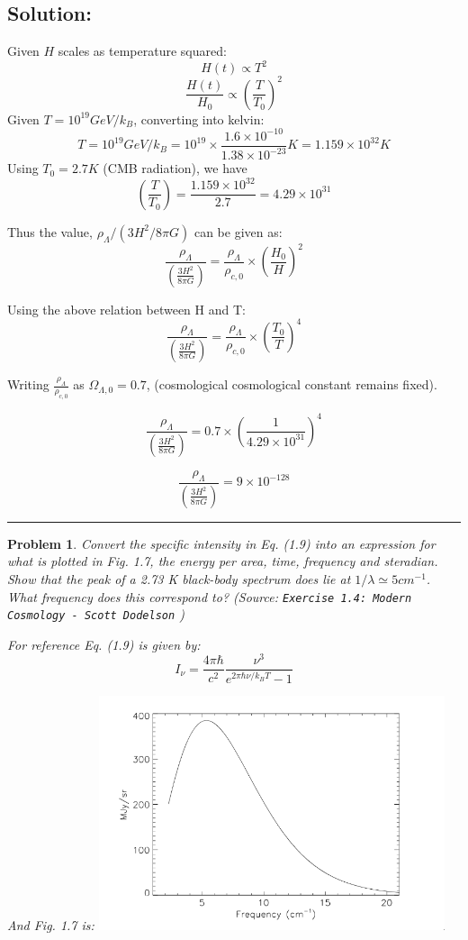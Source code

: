 \documentclass[11pt]{article}
\newenvironment{solution}{\subsection*{Solution:}}{\vspace{0.5cm} \hrule \vspace{0.7cm}}
\newtheorem{problem}{Problem}
\begin{document}
\begin{solution}
	Given $H$ scales as temperature squared:
	$$ H(t) \propto T^2 $$
	$$ \frac{H(t)}{H_0} \propto \left(\frac{T}{T_0}\right)^2 $$
	Given $T = 10^{19} GeV/k_B$, converting into kelvin:
	$$ T = 10^{19} GeV/k_B = 10^{19} \times \frac{1.6 \times 10^{-10}}{1.38
	\times 10^{-23}} K = 1.159 \times 10^{32} K$$
	Using $T_0 = 2.7 K$ (CMB radiation), we have
	$$ \left(\frac{T}{T_0}\right) = \frac{1.159 \times 10^{32} }{2.7} = 4.29
	\times 10^{31}$$

	Thus the value, $\rho_\Lambda/(3H^2/8\pi G) $ can be given as:
	$$ \frac{\rho_\Lambda}{\left(\frac{3H^2}{8\pi G}\right)} =
	\frac{\rho_\Lambda}{\rho_{c,0}} \times \left( \frac{H_0}{H} \right)^2$$

	Using the above relation between H and T:
	$$ \frac{\rho_\Lambda}{\left(\frac{3H^2}{8\pi G}\right)} =
	\frac{\rho_\Lambda}{\rho_{c,0}} \times \left( \frac{T_0}{T} \right)^4$$

	Writing $\frac{\rho_\Lambda}{\rho_{c,0}}$ as $ \Omega_{\Lambda, 0} =
	0.7$, (cosmological cosmological constant remains fixed).

	$$ \frac{\rho_\Lambda}{\left(\frac{3H^2}{8\pi G}\right)} =
	0.7 \times \left( \frac{1}{4.29 \times 10^{31}} \right)^4$$

	$$ \frac{\rho_\Lambda}{\left(\frac{3H^2}{8\pi G}\right)} =
	 9 \times 10^{-128}$$
\end{solution}


\begin{problem}
	Convert the specific intensity in Eq. (1.9) into an expression for what
	is plotted in
	Fig. 1.7, the energy per area, time, frequency and steradian. Show that
	the peak of a
	2.73 K black-body spectrum does lie at $1/\lambda \simeq  5 cm^{-1}$. What frequency does this
correspond to? (Source: \texttt{Exercise 1.4: Modern Cosmology - Scott Dodelson} )


	For reference Eq. (1.9) is given by:
	$$ I_\nu = \frac{4\pi\hbar}{c^2} \frac{\nu^3}{e^{2\pi\hbar\nu/k_BT} - 1} $$

	And Fig. 1.7 is:
        \center
	\includegraphics[width=4in]{1}
\end{problem}
\end{document}
